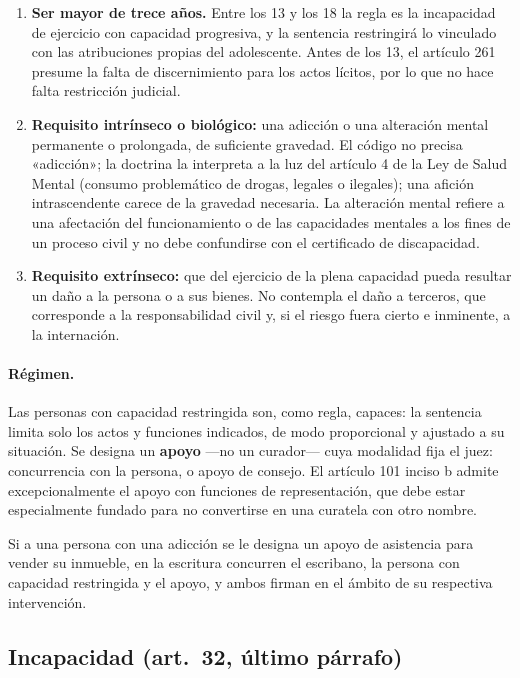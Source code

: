 \documentclass[12pt,oneside]{book}
\begin{document}
\begin{enumerate}
\item \textbf{Ser mayor de trece años.} Entre los 13 y los 18 la regla es la incapacidad de ejercicio con capacidad progresiva, y la sentencia restringirá lo vinculado con las atribuciones propias del adolescente. Antes de los 13, el artículo 261 presume la falta de discernimiento para los actos lícitos, por lo que no hace falta restricción judicial.
\item \textbf{Requisito intrínseco o biológico:} una adicción o una alteración mental permanente o prolongada, de suficiente gravedad. El código no precisa «adicción»; la doctrina la interpreta a la luz del artículo 4 de la Ley de Salud Mental (consumo problemático de drogas, legales o ilegales); una afición intrascendente carece de la gravedad necesaria. La alteración mental refiere a una afectación del funcionamiento o de las capacidades mentales a los fines de un proceso civil y no debe confundirse con el certificado de discapacidad.
\item \textbf{Requisito extrínseco:} que del ejercicio de la plena capacidad pueda resultar un daño a la persona o a sus bienes. No contempla el daño a terceros, que corresponde a la responsabilidad civil y, si el riesgo fuera cierto e inminente, a la internación.
\end{enumerate}

\paragraph{Régimen.} Las personas con capacidad restringida son, como regla, capaces: la sentencia limita solo los actos y funciones indicados, de modo proporcional y ajustado a su situación. Se designa un \textbf{apoyo} ---no un curador--- cuya modalidad fija el juez: concurrencia con la persona, o apoyo de consejo. El artículo 101 inciso b admite excepcionalmente el apoyo con funciones de representación, que debe estar especialmente fundado para no convertirse en una curatela con otro nombre.

\begin{ejemplo}
Si a una persona con una adicción se le designa un apoyo de asistencia para vender su inmueble, en la escritura concurren el escribano, la persona con capacidad restringida y el apoyo, y ambos firman en el ámbito de su respectiva intervención.
\end{ejemplo}

\subsection{Incapacidad (art.~32, último párrafo)}
\end{document}
